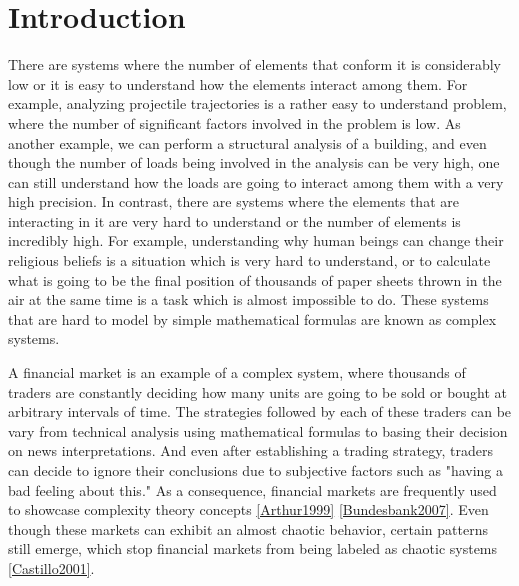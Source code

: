 \chapter{Introduction}
\label{chapter:introduction}


There are systems where the number of elements that conform it is considerably
low or it is easy to understand how the elements interact among them. For
example, analyzing projectile trajectories is a rather easy to understand
problem, where the number of significant factors involved in the problem is
low. As another example, we can perform a structural analysis of a building, and
even though the number of loads being involved in the analysis can be very high,
one can still understand how the loads are going to interact among them with a
very high precision. In contrast, there are systems where the elements that are
interacting in it are very hard to understand or the number of elements is
incredibly high. For example, understanding why human beings can change their
religious beliefs is a situation which is very hard to understand, or to
calculate what is going to be the final position of thousands of paper sheets
thrown in the air at the same time is a task which is almost impossible to
do. These systems that are hard to model by simple mathematical formulas are
known as complex systems.

A financial market is an example of a complex system, where thousands of traders
are constantly deciding how many units are going to be sold or bought at
arbitrary intervals of time. The strategies followed by each of these traders
can be vary from technical analysis using mathematical formulas to basing their
decision on news interpretations. And even after establishing a trading
strategy, traders can decide to ignore their conclusions due to subjective
factors such as "having a bad feeling about this." As a consequence, financial
markets are frequently used to showcase complexity theory concepts
\ref{Arthur1999} \ref{Bundesbank2007}. Even though these markets can exhibit an
almost chaotic behavior, certain patterns still emerge, which stop financial
markets from being labeled as chaotic systems \ref{Castillo2001}.


